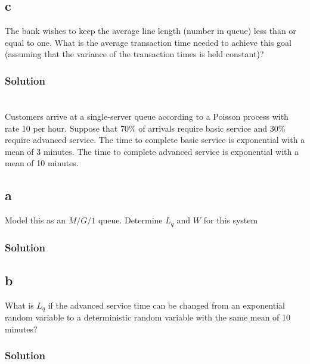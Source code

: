 \documentclass[letterpaper]{amsart}
\begin{document}
\subsection*{c}
The bank wishes to keep the average line length (number in queue) less
than or equal to one. What is the average transaction time needed to
achieve this goal (assuming that the variance of the transaction times is
held constant)?
\subsubsection*{Solution}

\section{} %
Customers arrive at a single-server queue according to a Poisson process with rate
10 per hour. Suppose that 70\% of arrivals require basic service and 30\% require
advanced service. The time to complete basic service is exponential with a mean
of 3 minutes. The time to complete advanced service is exponential with a mean
of 10 minutes.
\subsection*{a}
Model this as an $M/G/1$ queue. Determine $L_q$ and $W$ for this system
\subsubsection*{Solution}
\subsection*{b}
What is $L_q$ if the advanced service time can be changed from an
exponential random variable to a deterministic random variable with the
same mean of 10 minutes?
\subsubsection*{Solution}
\end{document}
